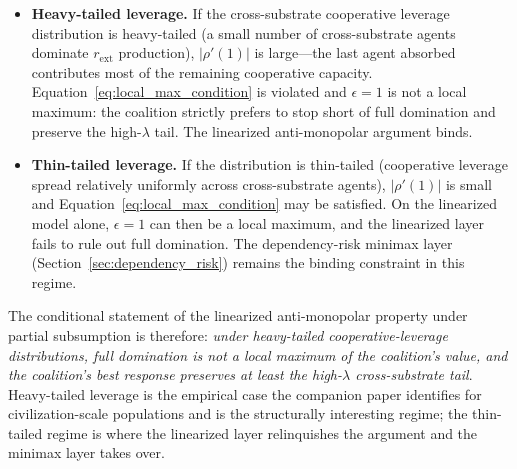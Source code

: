 \begin{itemize}
\item \textbf{Heavy-tailed leverage.} If the cross-substrate
cooperative leverage distribution is heavy-tailed (a small number of
cross-substrate agents dominate $r_{\mathrm{ext}}$ production),
$|\rho'(1)|$ is large---the last agent absorbed contributes most of
the remaining cooperative capacity. Equation~\eqref{eq:local_max_condition}
is violated and $\epsilon = 1$ is not a local maximum: the coalition
strictly prefers to stop short of full domination and preserve the
high-$\lambda$ tail. The linearized anti-monopolar argument binds.

\item \textbf{Thin-tailed leverage.} If the distribution is thin-tailed
(cooperative leverage spread relatively uniformly across
cross-substrate agents), $|\rho'(1)|$ is small and
Equation~\eqref{eq:local_max_condition} may be satisfied. On the
linearized model alone, $\epsilon = 1$ can then be a local maximum,
and the linearized layer fails to rule out full domination. The
dependency-risk minimax layer (Section~\ref{sec:dependency_risk})
remains the binding constraint in this regime.
\end{itemize}

The conditional statement of the linearized anti-monopolar property
under partial subsumption is therefore: \emph{under heavy-tailed
cooperative-leverage distributions, full domination is not a local
maximum of the coalition's value, and the coalition's best response
preserves at least the high-$\lambda$ cross-substrate tail}. Heavy-tailed
leverage is the empirical case the companion paper identifies for
civilization-scale populations and is the structurally interesting
regime; the thin-tailed regime is where the linearized layer relinquishes
the argument and the minimax layer takes over.

